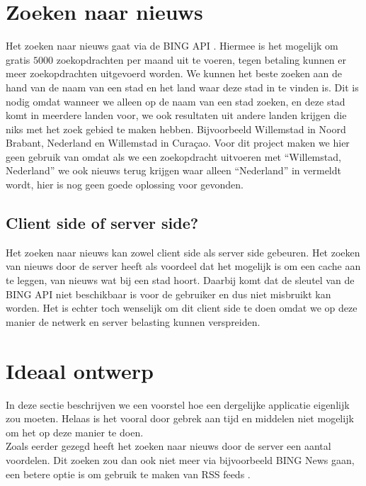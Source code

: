 \documentclass[twoside,openright]{uva-bachelor-thesis}
\begin{document}
	\section{Zoeken naar nieuws}
		Het zoeken naar nieuws gaat via de BING API \cite{BINGNews}. Hiermee is het mogelijk om gratis $5000$ zoekopdrachten per maand uit te voeren, tegen betaling kunnen er meer zoekopdrachten uitgevoerd worden. We kunnen het beste zoeken aan de hand van de naam van een stad en het land waar deze stad in te vinden is. Dit is nodig omdat wanneer we alleen op de naam van een stad zoeken, en deze stad komt in meerdere landen voor, we ook resultaten uit andere landen krijgen die niks met het zoek gebied te maken hebben. Bijvoorbeeld Willemstad in Noord Brabant, Nederland en Willemstad in Cura\c{c}ao. Voor dit project maken we hier geen gebruik van omdat als we een zoekopdracht uitvoeren met ``Willemstad, Nederland'' we ook nieuws terug krijgen waar alleen ``Nederland'' in vermeldt wordt, hier is nog geen goede oplossing voor gevonden. 
		\subsection{Client side of server side?}
			Het zoeken naar nieuws kan zowel client side als server side gebeuren.
			Het zoeken van nieuws door de server heeft als voordeel dat het mogelijk is om een cache aan te leggen, van nieuws wat bij een stad hoort. Daarbij komt dat de sleutel van de BING API niet beschikbaar is voor de gebruiker en dus niet misbruikt kan worden. Het is echter toch wenselijk om dit client side te doen omdat we op deze manier de netwerk en server belasting kunnen verspreiden. 
	\section{Ideaal ontwerp}
		In deze sectie beschrijven we een voorstel hoe een dergelijke applicatie eigenlijk zou moeten. Helaas is het vooral door gebrek aan tijd en middelen niet mogelijk om het op deze manier te doen. 
		\\[0.5cm]
		Zoals eerder gezegd heeft het zoeken naar nieuws door de server een aantal voordelen. Dit zoeken zou dan ook niet meer via bijvoorbeeld BING News gaan, een betere optie is om gebruik te maken van RSS feeds \cite{RSS}.
\end{document}
